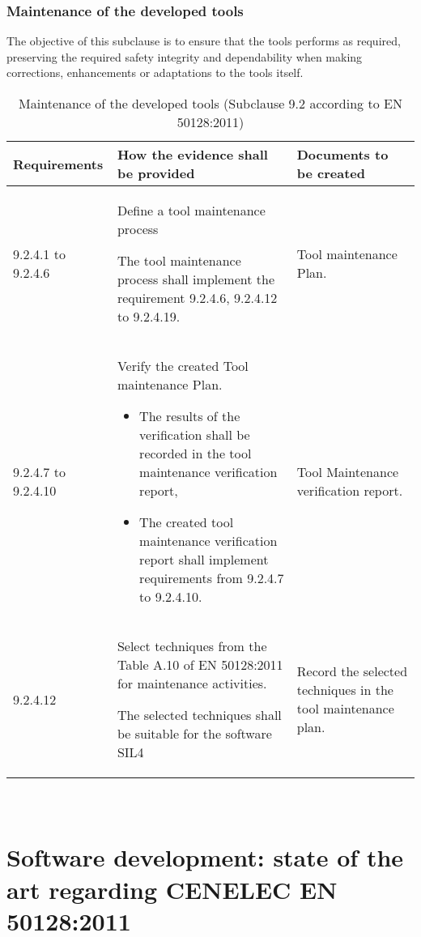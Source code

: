 \documentclass{template/openetcs_report}
\begin{document}
\subsection{Maintenance of the developed tools}
\begin{flushleft}
 The objective of this subclause is to ensure that the tools performs as required, preserving the required safety integrity and dependability when making corrections, enhancements or adaptations to the tools itself.
 \end{flushleft} 
{\footnotesize\sffamily\centering
\begin{longtable}{|p{2cm}|p{9cm}|p{3cm}|}
\caption{Maintenance of the developed tools (Subclause 9.2 according to EN 50128:2011)}\\
\hline
\bfseries Requirements & \bfseries How the evidence shall be provided & \bfseries Documents to be created\\
\hline
\hline
\endhead
\hline
\endfoot

9.2.4.1 to 9.2.4.6 & Define a tool maintenance process

The tool maintenance process shall implement the requirement 9.2.4.6, 9.2.4.12 to 9.2.4.19. 
& Tool maintenance Plan.\\ 
\hline
9.2.4.7 to 9.2.4.10 & Verify the created Tool maintenance Plan.
\begin{itemize}\itemsep=0pt
  \item The results of the verification shall be recorded in the tool maintenance verification report,
  \item The created tool maintenance verification report shall implement requirements from 9.2.4.7 to 9.2.4.10. 
\end{itemize}
& Tool Maintenance verification report.\\ 
\hline
9.2.4.12 & Select techniques from the Table A.10 of EN 50128:2011 for maintenance activities. 

The selected techniques shall be suitable for the software SIL4 
& Record the selected techniques in the tool maintenance plan.\\ 
\hline
\end{longtable}}




\chapter{\\Software development: state of the art regarding CENELEC EN 50128:2011}
\label{annexC}
\end{document}
